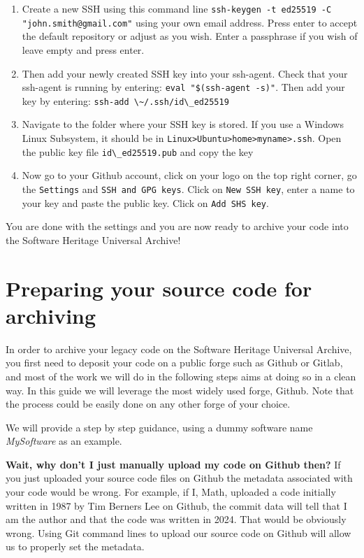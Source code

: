 \documentclass[]{article}
\newcommand{\passthrough}[1]{#1}
\providecommand{\tightlist}{%
  \setlength{\itemsep}{0pt}\setlength{\parskip}{0pt}}
\begin{document}
\begin{enumerate}
\def\labelenumi{\arabic{enumi})}
\tightlist
\item
  Create a new SSH using this command line
  \passthrough{\lstinline!ssh-keygen -t ed25519 -C "john.smith@gmail.com"!}
  using your own email address. Press enter to accept the default
  repository or adjust as you wish. Enter a passphrase if you wish of
  leave empty and press enter.
\item
  Then add your newly created SSH key into your ssh-agent. Check that
  your ssh-agent is running by entering:
  \passthrough{\lstinline!eval "$(ssh-agent -s)"!}. Then add your key by
  entering: \passthrough{\lstinline!ssh-add \~/.ssh/id\_ed25519!}
\item
  Navigate to the folder where your SSH key is stored. If you use a
  Windows Linux Subsystem, it should be in
  \passthrough{\lstinline!Linux>Ubuntu>home>myname>.ssh!}. Open the
  public key file \passthrough{\lstinline!id\_ed25519.pub!} and copy the
  key
\item
  Now go to your Github account, click on your logo on the top right
  corner, go the \passthrough{\lstinline!Settings!} and
  \passthrough{\lstinline!SSH and GPG keys!}. Click on
  \passthrough{\lstinline!New SSH key!}, enter a name to your key and
  paste the public key. Click on \passthrough{\lstinline!Add SHS key!}.
\end{enumerate}

You are done with the settings and you are now ready to archive your
code into the Software Heritage Universal Archive!

\hypertarget{sec:prepare}{%
\section{Preparing your source code for archiving}\label{sec:prepare}}

In order to archive your legacy code on the Software Heritage Universal
Archive, you first need to deposit your code on a public forge such as
Github or Gitlab, and most of the work we will do in the following steps
aims at doing so in a clean way. In this guide we will leverage the most
widely used forge, Github. Note that the process could be easily done on
any other forge of your choice.

We will provide a step by step guidance, using a dummy software name
\emph{MySoftware} as an example.

\textbf{Wait, why don't I just manually upload my code on Github then?}
If you just uploaded your source code files on Github the metadata
associated with your code would be wrong. For example, if I, Math,
uploaded a code initially written in 1987 by Tim Berners Lee on Github,
the commit data will tell that I am the author and that the code was
written in 2024. That would be obviously wrong. Using Git command lines
to upload our source code on Github will allow us to properly set the
metadata.
\end{document}

